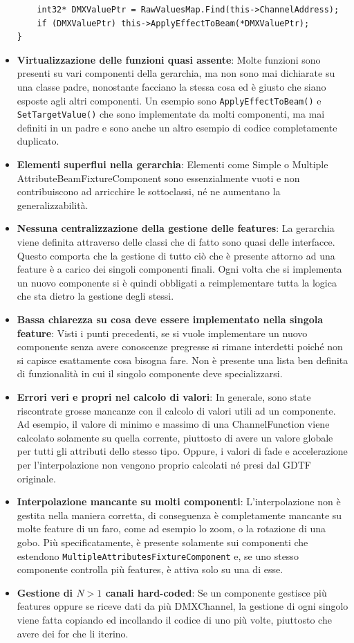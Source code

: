 \documentclass[main.tex]{subfiles}
\begin{document}
\begin{itemize}
\begin{lstlisting}
	int32* DMXValuePtr = RawValuesMap.Find(this->ChannelAddress);
	if (DMXValuePtr) this->ApplyEffectToBeam(*DMXValuePtr);
}
\end{lstlisting}
    \item \textbf{Virtualizzazione delle funzioni quasi assente}: Molte funzioni sono presenti su vari componenti della gerarchia, ma non sono mai dichiarate su una classe padre, nonostante facciano la stessa cosa ed è giusto che siano esposte agli altri componenti. Un esempio sono \lstinline{ApplyEffectToBeam()} e \lstinline{SetTargetValue()} che sono implementate da molti componenti, ma mai definiti in un padre e sono anche un altro esempio di codice completamente duplicato.
    \item \textbf{Elementi superflui nella gerarchia}: Elementi come Simple o Multiple AttributeBeamFixtureComponent sono essenzialmente vuoti e non contribuiscono ad arricchire le sottoclassi, né ne aumentano la generalizzabilità.
    \item \textbf{Nessuna centralizzazione della gestione delle features}: La gerarchia viene definita attraverso delle classi che di fatto sono quasi delle interfacce. Questo comporta che la gestione di tutto ciò che è presente attorno ad una feature è a carico dei singoli componenti finali. Ogni volta che si implementa un nuovo componente si è quindi obbligati a reimplementare tutta la logica che sta dietro la gestione degli stessi.
    \item \textbf{Bassa chiarezza su cosa deve essere implementato nella singola feature}: Visti i punti precedenti, se si vuole implementare un nuovo componente senza avere conoscenze pregresse si rimane interdetti poiché non si capisce esattamente cosa bisogna fare. Non è presente una lista ben definita di funzionalità in cui il singolo componente deve specializzarsi.
    \item \textbf{Errori veri e propri nel calcolo di valori}: In generale, sono state riscontrate grosse mancanze con il calcolo di valori utili ad un componente. Ad esempio, il valore di minimo e massimo di una ChannelFunction viene calcolato solamente su quella corrente, piuttosto di avere un valore globale per tutti gli attributi dello stesso tipo. Oppure, i valori di fade e accelerazione per l'interpolazione non vengono proprio calcolati né presi dal GDTF originale.
    \item \textbf{Interpolazione mancante su molti componenti}: L'interpolazione non è gestita nella maniera corretta, di conseguenza è completamente mancante su molte feature di un faro, come ad esempio lo zoom, o la rotazione di una gobo. Più specificatamente, è presente solamente sui componenti che estendono \lstinline{MultipleAttributesFixtureComponent} e, se uno stesso componente controlla più features, è attiva solo su una di esse.
    \clearpage
    \item \textbf{Gestione di $N > 1$ canali hard-coded}: Se un componente gestisce più features oppure se riceve dati da più DMXChannel, la gestione di ogni singolo viene fatta copiando ed incollando il codice di uno più volte, piuttosto che avere dei for che li iterino.
\end{itemize}
\end{document}
